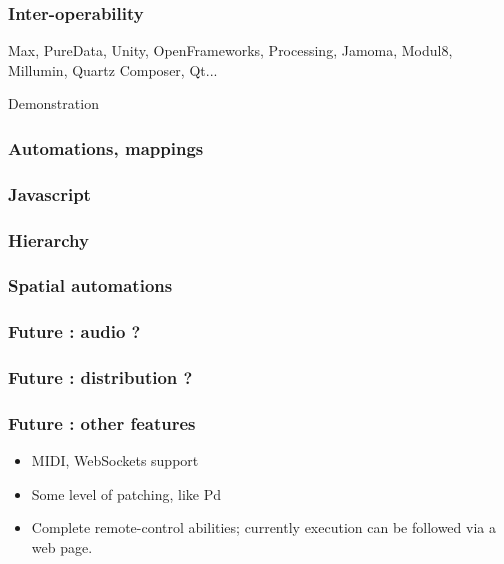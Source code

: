 \documentclass{beamer}
\begin{document}
    \begin{frame}
        \frametitle{Inter-operability}
        Max, PureData, Unity, OpenFrameworks, Processing, Jamoma, Modul8, Millumin, Quartz Composer, Qt...
    \end{frame}
    
    \begin{frame}
        \centering \Huge Demonstration
    \end{frame}
    
    \begin{frame}
        \frametitle{Automations, mappings}
        
    \end{frame}
    
    \begin{frame}
        \frametitle{Javascript}
        
    \end{frame}
    
    \begin{frame}
        \frametitle{Hierarchy}
        
    \end{frame}
    
    \begin{frame}
        \frametitle{Spatial automations}
        
    \end{frame}
    
    \begin{frame}
        \frametitle{Future : audio ?}
        
    \end{frame}

\begin{frame}
    \frametitle{Future : distribution ?}
    
\end{frame}

\begin{frame}
    \frametitle{Future : other features}
    
    \begin{itemize}
    \item MIDI, WebSockets support
    \item Some level of patching, like Pd
    \item Complete remote-control abilities; currently execution can be followed via a web page.
    \end{itemize}
\end{frame}
\end{document}
